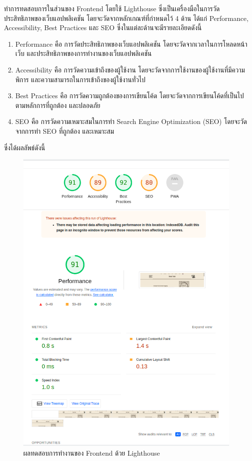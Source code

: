\documentclass[12pt,oneside,openright,a4paper]{cpe-thai-project}
\begin{document}
        \hspace{1cm}ทำการทดสอบการในส่วนของ Frontend โดยใช้ Lighthouse ซึ่งเป็นเครื่องมือในการวัดประสิทธิภาพของเว็บแอปพลิเคชัน โดยจะวัดจากหลักเกณฑ์ที่กำหนดไว้ 4 ด้าน ได้แก่ Performance, Accessibility, Best Practices และ SEO 
        ซึ่งในแต่ละด้านจะมีรายละเอียดดังนี้
        \begin{enumerate}
          \item Performance คือ การวัดประสิทธิภาพของเว็บแอปพลิเคชัน โดยจะวัดจากเวลาในการโหลดหน้าเว็บ และประสิทธิภาพของการทำงานของเว็บแอปพลิเคชัน
          \item Accessibility คือ การวัดความเข้าถึงของผู้ใช้งาน โดยจะวัดจากการใช้งานของผู้ใช้งานที่มีความพิการ และความสามารถในการเข้าถึงของผู้ใช้งานทั่วไป
          \item Best Practices คือ การวัดความถูกต้องของการเขียนโค้ด โดยจะวัดจากการเขียนโค้ดที่เป็นไปตามหลักการที่ถูกต้อง และปลอดภัย
          \item SEO คือ การวัดความเหมาะสมในการทำ Search Engine Optimization (SEO) โดยจะวัดจากการทำ SEO ที่ถูกต้อง และเหมาะสม
        \end{enumerate}
        ซึ่งได้ผลลัพธ์ดังนี้
        \begin{figure}[!ht]\centering
          \includegraphics[width=\textwidth]{./img/lighthouse.png}
          \caption{ผลทดสอบการทำงานของ Frontend ด้วย Lighthouse}\label{fig:lighthouse}
        \end{figure}
\end{document}
